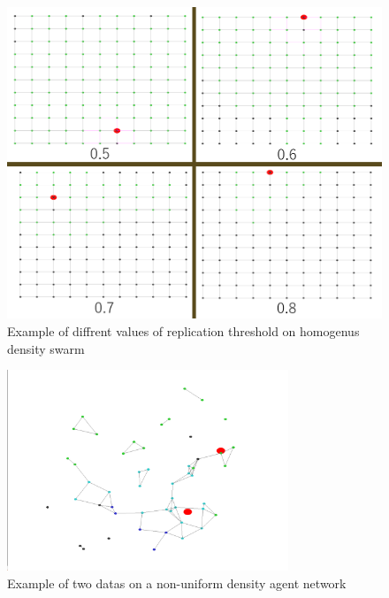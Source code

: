 \documentclass{UoYCSproject}
\begin{document}
\begin{figure}[htb]
\label{fig:Data6}
\begin{center}
\centering
\includegraphics[width=\linewidth]{"./Replication_No_Suicide_threshold_Together.png"}
\caption{Example of diffrent values of replication threshold on homogenus density swarm}
\end{center}
\end{figure}

\begin{figure}[htb]
\label{fig:Data7}
\begin{center}
\centering
\includegraphics[height=6cm]{"./Replication_No_Suicide_threshold_0.8_c2_Non_uniform.png"}
\caption{Example of two datas on a non-uniform density agent network}
\end{center}
\end{figure}
\end{document}
